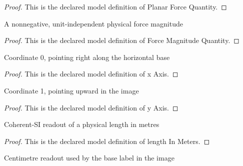 \begin{proof}
  This is the declared model definition of Planar Force Quantity.
\end{proof}
\begin{definition}
  \label{def:physics:phyx-mini-0907:phyxminiproblems-problemphyxmini0907-forcemagnitudequantity}
  A nonnegative, unit-independent physical force magnitude
\end{definition}
\begin{proof}
  This is the declared model definition of Force Magnitude Quantity.
\end{proof}
\begin{definition}[x Axis]
  \label{def:physics:phyx-mini-0907:phyxminiproblems-problemphyxmini0907-xaxis}
  Coordinate 0, pointing right along the horizontal base
\end{definition}
\begin{proof}
  This is the declared model definition of x Axis.
\end{proof}
\begin{definition}[y Axis]
  \label{def:physics:phyx-mini-0907:phyxminiproblems-problemphyxmini0907-yaxis}
  Coordinate 1, pointing upward in the image
\end{definition}
\begin{proof}
  This is the declared model definition of y Axis.
\end{proof}
\begin{definition}
  \label{def:physics:phyx-mini-0907:phyxminiproblems-problemphyxmini0907-lengthinmeters}
  Coherent-SI readout of a physical length in metres
\end{definition}
\begin{proof}
  This is the declared model definition of length In Meters.
\end{proof}
\begin{definition}
  \label{def:physics:phyx-mini-0907:phyxminiproblems-problemphyxmini0907-lengthincentimeters}
  Centimetre readout used by the base label in the image
\end{definition}
